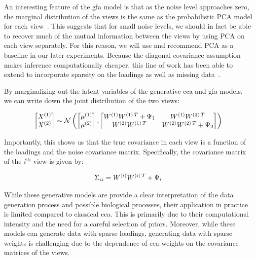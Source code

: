 An interesting feature of the \acrshort{gfa} model is that as the noise level approaches zero, the marginal distribution of the views is the same as the probabilistic PCA model for each view~\citep{tipping1999probabilistic}.
This suggests that for small noise levels, we should in fact be able to recover much of the mutual information between the views by using PCA on each view separately.
For this reason, we will use and recommend PCA as a baseline in our later experiments.
Because the diagonal covariance assumption makes inference computationally cheaper, this line of work has been able to extend to incorporate sparsity on the loadings\citep{virtanen2011bayesian} as well as missing data~\citep{ferreira2022hierarchical}.

By marginalizing out the latent variables of the generative \acrshort{cca} and \acrshort{gfa} models, we can write down the joint distribution of the two views:

\begin{align}
    \begin{bmatrix} X^{(1)} \\ X^{(2)} \end{bmatrix} \sim \mathcal{N} \left( \begin{bmatrix} \mu^{(1)} \\ \mu^{(2)} \end{bmatrix}, \begin{bmatrix} W^{(1)}W^{(1)\,T} + \Psi_1 & W^{(1)}W^{(2)\,T} \\ W^{(2)}W^{(1)\,T} & W^{(2)}W^{(2)\,T} + \Psi_2 \end{bmatrix} \right)
\end{align}

Importantly, this shows us that the true covariance in each view is a function of the \gls{loadings} and the noise covariance matrix.
Specifically, the covariance matrix of the $i^{\text{th}}$ view is given by:

\begin{align}
    \Sigma_{ii} = W^{(i)}W^{(i)\,T} + \Psi_i
\end{align}

While these generative models are provide a clear interpretation of the data generation process and possible biological processes, their application in practice is limited compared to classical \acrshort{cca}.
This is primarily due to their computational intensity and the need for a careful selection of priors.
Moreover, while these models can generate data with sparse loadings, generating data with sparse weights is challenging due to the dependence of \acrshort{cca} weights on the covariance matrices of the views.

